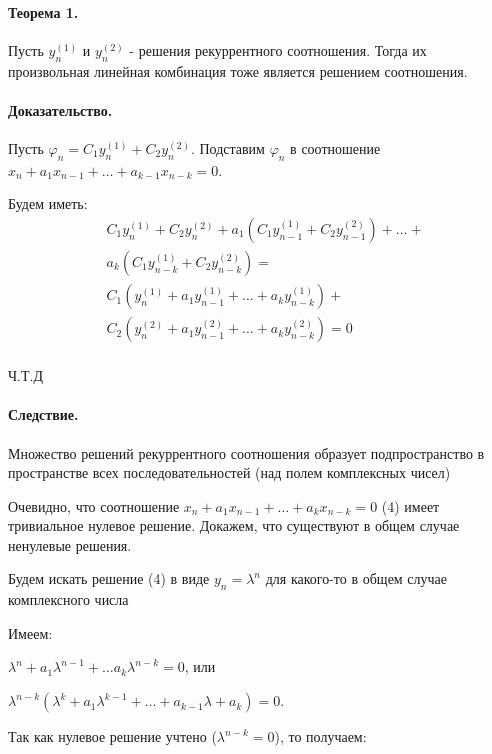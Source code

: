 \documentclass{report}
\begin{document}
\medskip

\paragraph*{Теорема 1.}
Пусть $y_{n}^{(1)}$ и $y_{n}^{(2)}$ - решения рекуррентного соотношения. Тогда их
произвольная линейная комбинация тоже является решением соотношения.

\paragraph*{Доказательство.}
Пусть $\varphi_{n} = C_1y^{(1)}_{n} + C_2y^{(2)}_{n}$. Подставим
$\varphi_{n}$ в соотношение $x_{n} + a_1x_{n-1} + \ldots + a_{k-1}x_{n-k} = 0$.

Будем иметь:
\begin{align*}
&C_1y^{(1)}_{n} + C_2y^{(2)}_{n} + a_1(C_1y^{(1)}_{n-1} + C_2y^{(2)}_{n-1}) + \ldots + \\
&a_{k}(C_1y^{(1)}_{n-k} + C_2y^{(2)}_{n-k}) = \\
&C_1(y^{(1)}_{n} + a_1y^{(1)}_{n-1} + \ldots + a_{k}y^{(1)}_{n - k}) + \\
&C_2(y^{(2)}_{n} + a_1y^{(2)}_{n-1} + \ldots + a_{k}y^{(2)}_{n - k}) = 0 \\
\end{align*}

Ч.Т.Д

\paragraph*{Следствие.}
Множество решений рекуррентного соотношения образует подпространство
в пространстве всех последовательностей (над полем комплексных чисел)

\medskip

Очевидно, что соотношение $x_{n} + a_1x_{n-1} + \ldots + a_{k}x_{n-k} = 0$ (4) имеет
тривиальное нулевое решение. Докажем, что существуют в общем случае ненулевые решения.

Будем искать решение (4) в виде $y_{n} = \lambda^{n}$ для какого-то
в общем случае комплексного числа \lambda

\medskip

Имеем:

$\lambda^{n} + a_1\lambda^{n-1} + \ldots a_{k}\lambda^{n-k} = 0$, или

$\lambda^{n-k}(\lambda^{k} + a_1\lambda^{k-1} + \ldots + a_{k-1}\lambda + a_{k}) = 0$.

Так как нулевое решение учтено ($\lambda^{n-k} = 0$), то получаем:
\end{document}
